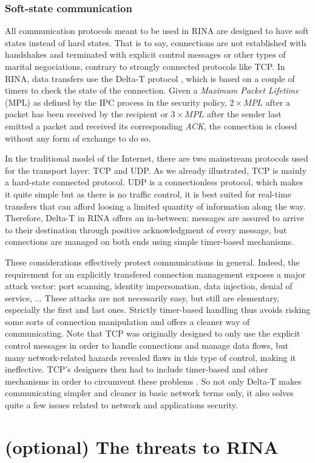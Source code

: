 \documentclass[a4paper]{proc}
\begin{document}
\section{Soft-state communication}

\par All communication protocols meant to be used in RINA are designed to have
soft states instead of hard states. That is to say, connections are not
established with handshakes and terminated with explicit control messages or
other types of marital negociations, contrary to strongly connected protocols
like TCP. In RINA, data transfers use the Delta-T protocol \cite{delta-t}, which
is based on a couple of timers to check the state of the connection. Given a
\textit{Maximum Packet Lifetime} (MPL) as defined by the IPC process in the
security policy, $2 \times MPL$ after a packet has been received by the
recipient or $3 \times MPL$ after the sender last emitted a packet and received
its corresponding \textit{ACK}, the connection is closed without any form of
exchange to do so.

\par In the traditional model of the Internet, there are two mainstream
protocols used for the transport layer: TCP and UDP. As we already illustrated,
TCP is mainly a hard-state connected protocol. UDP is a connectionless protocol,
which makes it quite simple but as there is no traffic control, it is best
suited for real-time transfers that can afford loosing a limited quantity of
information along the way. Therefore, Delta-T in RINA offers an in-between:
messages are assured to arrive to their destination through positive
acknowledgment of every message, but connections are managed on both ends using
simple timer-based mechanisms.

\par These considerations effectively protect communications in general. Indeed,
the requirement for an explicitly transfered connection management exposes a
major attack vector: port scanning, identity impersonation, data injection,
denial of service, ... These attacks are not necessarily easy, but still are
elementary, especially the first and last ones. Strictly timer-based handling
thus avoids risking some sorts of connection manipulation and offers a cleaner
way of communicating. Note that TCP was originally designed to only use the
explicit control messages in order to handle connections and manage data flows,
but many network-related hazards revealed flaws in this type of control, making
it ineffective. TCP's designers then had to include timer-based and other
mechanisms in order to circumvent these problems \cite{delta-t}. So not only
Delta-T makes communicating simpler and cleaner in basic network terms only, it
also solves quite a few issues related to network and applications security.


\part{(optional) The threats to RINA}


\nocite{*}
\newpage


\end{document}
